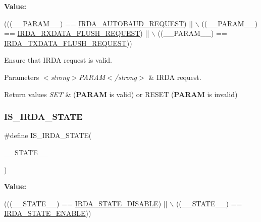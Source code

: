 {\bfseries Value\+:}
\begin{DoxyCode}
(((\_\_PARAM\_\_) == \hyperlink{group___i_r_d_a___request___parameters_ga6431d33b8cf9df0d86e29a210df6d454}{IRDA\_AUTOBAUD\_REQUEST}) || \(\backslash\)
                                              ((\_\_PARAM\_\_) == 
      \hyperlink{group___i_r_d_a___request___parameters_gade40b479c4ee0227c2851e7eb3f0f930}{IRDA\_RXDATA\_FLUSH\_REQUEST}) || \(\backslash\)
                                              ((\_\_PARAM\_\_) == 
      \hyperlink{group___i_r_d_a___request___parameters_ga15f0617bb3c52ca8936f1d9127274ac9}{IRDA\_TXDATA\_FLUSH\_REQUEST}))
\end{DoxyCode}


Ensure that I\+R\+DA request is valid. 


\begin{DoxyParams}{Parameters}
{\em $<$strong$>$\+P\+A\+R\+A\+M$<$/strong$>$} & I\+R\+DA request. \\
\hline
\end{DoxyParams}

\begin{DoxyRetVals}{Return values}
{\em S\+ET} & ({\bfseries P\+A\+R\+AM} is valid) or R\+E\+S\+ET ({\bfseries P\+A\+R\+AM} is invalid) \\
\hline
\end{DoxyRetVals}
\mbox{\label{group___i_r_d_a___private___macros_gadbef223495eba26be840e14cc37d34d8}} 
\subsubsection{\texorpdfstring{I\+S\+\_\+\+I\+R\+D\+A\+\_\+\+S\+T\+A\+TE}{IS\_IRDA\_STATE}}
{\footnotesize\ttfamily \#define I\+S\+\_\+\+I\+R\+D\+A\+\_\+\+S\+T\+A\+TE(\begin{DoxyParamCaption}\item[{}]{\+\_\+\+\_\+\+S\+T\+A\+T\+E\+\_\+\+\_\+ }\end{DoxyParamCaption})}

{\bfseries Value\+:}
\begin{DoxyCode}
(((\_\_STATE\_\_) == \hyperlink{group___i_r_d_a___state_gafe8a4ac9dd67528fba0e452fc9fa38d6}{IRDA\_STATE\_DISABLE}) || \(\backslash\)
                                  ((\_\_STATE\_\_) == \hyperlink{group___i_r_d_a___state_ga45411b354a12cbbde6a510fc4713c1b2}{IRDA\_STATE\_ENABLE}))
\end{DoxyCode}


